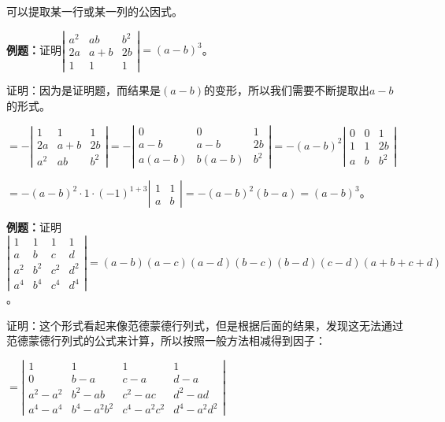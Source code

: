 \documentclass[UTF8, 12pt]{ctexart}
\begin{document}
可以提取某一行或某一列的公因式。

\textbf{例题：}证明$\left|\begin{array}{ccc} 
    a^2 & ab & b^2 \\
    2a & a+b & 2b \\
    1 & 1 & 1
\end{array}\right|=(a-b)^3$。

证明：因为是证明题，而结果是$(a-b)$的变形，所以我们需要不断提取出$a-b$的形式。

$=-\left|\begin{array}{ccc} 
    1 & 1 & 1 \\
    2a & a+b & 2b \\
    a^2 & ab & b^2
\end{array}\right|
=-\left|\begin{array}{ccc} 
    0 & 0 & 1 \\
    a-b & a-b & 2b \\
    a(a-b) & b(a-b) & b^2
\end{array}\right|
=-(a-b)^2\left|\begin{array}{ccc} 
    0 & 0 & 1 \\
    1 & 1 & 2b \\
    a & b & b^2
\end{array}\right|$

$=-(a-b)^2\cdot1\cdot(-1)^{1+3}\left|\begin{array}{cc} 
    1 & 1 \\
    a & b
\end{array}\right|=-(a-b)^2(b-a)=(a-b)^3$。

\textbf{例题：}证明$\left|\begin{array}{cccc} 
    1 & 1 & 1 & 1 \\
    a & b & c & d \\
    a^2 & b^2 & c^2 & d^2 \\
    a^4 & b^4 & c^4 & d^4
\end{array}\right|=(a-b)(a-c)(a-d)(b-c)(b-d)(c-d)(a+b+c+d)$。

证明：这个形式看起来像范德蒙德行列式，但是根据后面的结果，发现这无法通过范德蒙德行列式的公式来计算，所以按照一般方法相减得到因子：

$=\left|\begin{array}{cccc} 
    1 & 1 & 1 & 1 \\
    0 & b-a & c-a & d-a \\
    a^2-a^2 & b^2-ab & c^2-ac & d^2-ad \\
    a^4-a^4 & b^4-a^2b^2 & c^4-a^2c^2 & d^4-a^2d^2
\end{array}\right|$
\end{document}
